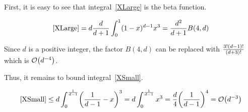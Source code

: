 First, it is easy to see that integral~\ref{XLarge} is the beta function.

\begin{equation*}
	\eqref{XLarge} = d \frac{d}{d + 1} \int_0^1 (1 - x)^{d - 1} x^3 = \frac{d^2}{d + 1} B(4, d)
\end{equation*}

Since $d$ is a positive integer, the factor $B(4, d)$ can be replaced with $\frac{3! \parens*{d - 1}!}{\parens*{d + 3}!}$ which is $\BigO\parens*{d^{-4}}$.

Thus, it remains to bound integral~\ref{XSmall}.

\begin{equation*}
	\eqref{XSmall} \leq d \int_{0}^{\frac{1}{d - 1}} \parens*{\frac{1}{d - 1} - x}^3 =  d \int_{0}^{\frac{1}{d - 1}} x^3 = \frac{d}{4} \parens*{\frac{1}{d - 1}}^4 = \BigO \parens*{d^{-3}}
\end{equation*}
